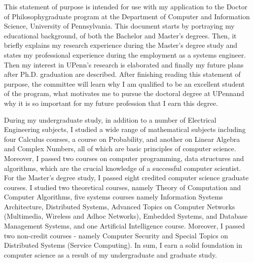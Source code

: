 \documentclass[a4paper,10pt]{report}
\newcommand{\university}{University of Pennsylvania}
\newcommand{\department}{Department of Computer and Information Science}
\newcommand{\uniabbre}{UPenn}
\newcommand{\degree}{Doctor of Philosophy}
\begin{document}

\vspace{0.4cm}
This statement of purpose is intended for use with my application to the \degree \space graduate program at the \department, \university. This document starts by portraying my educational background, of both the Bachelor and Master's degrees. Then, it briefly explains my research experience during the Master's degree study and states my professional experience during the employment as a systems engineer. Then my interest in \uniabbre's research is elaborated and finally my future plans after Ph.D. graduation are described. After finishing reading this statement of purpose, the committee will learn why I am qualified to be an excellent student of the program, what motivates me to pursue the doctoral degree at \uniabbre \space and why it is so important for my future profession that I earn this degree.

\vspace{0.2cm}
During my undergraduate study, in addition to a number of Electrical Engineering subjects, I studied a wide range of mathematical subjects including four Calculus courses, a course on Probability, and another on Linear Algebra and Complex Numbers, all of which are basic principles of computer science. Moreover, I passed two courses on computer programming, data structures and algorithms, which are the crucial knowledge of a successful computer scientist. For the Master's degree study, I passed eight credited computer science graduate courses. I studied two theoretical courses, namely Theory of Computation and Computer Algorithms, five systems courses namely Information Systems Architecture, Distributed Systems, Advanced Topics on Computer Networks (Multimedia, Wireless and Adhoc Networks), Embedded Systems, and Database Management Systems, and one Artificial Intelligence course. Moreover, I passed two non-credit courses - namely Computer Security and Special Topics on Distributed Systems (Service Computing). In sum, I earn a solid foundation in computer science as a result of my undergraduate and graduate study. 
\end{document}

